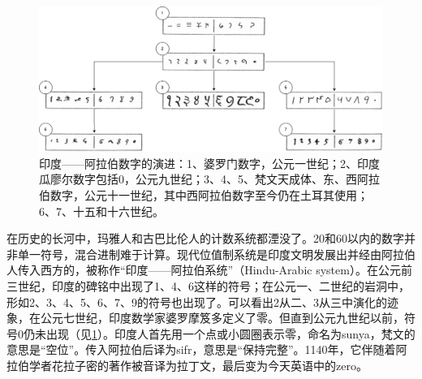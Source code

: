 \documentclass[b5paper]{ctexart}
\begin{document}
\begin{figure}[htbp]
 \centering
 \includegraphics[scale=0.3]{img/Hindu-arabic-num}
 \caption{印度——阿拉伯数字的演进：1、婆罗门数字，公元一世纪；2、印度瓜廖尔数字包括0，公元九世纪；3、4、5、梵文天成体、东、西阿拉伯数字，公元十一世纪，其中西阿拉伯数字至今仍在土耳其使用；6、7、十五和十六世纪。}
 \label{fig:hindu-arabic-numerals}
\end{figure}

   \label{sec:hindu-arabic-numerals}
在历史的长河中，玛雅人和古巴比伦人的计数系统都湮没了。20和60以内的数字并非单一符号，混合进制难于计算。现代位值制系统是印度文明发展出并经由阿拉伯人传入西方的，被称作“印度——阿拉伯系统”（Hindu-Arabic system）。在公元前三世纪，印度的碑铭中出现了1、4、6这样的符号；在公元一、二世纪的岩洞中，形如2、3、4、5、6、7、9的符号也出现了。可以看出2从二、3从三中演化的迹象，在公元七世纪，印度数学家婆罗摩笈多定义了零\cite{MacTutor-Brahmagupta-2000}。但直到公元九世纪以前，符号0仍未出现（见\cref{fig:hindu-arabic-numerals}）。印度人首先用一个点或小圆圈表示零，命名为sunya，梵文的意思是“空位”。传入阿拉伯后译为sifr，意思是“保持完整”。1140年，它伴随着阿拉伯学者花拉子密的著作被音译为拉丁文，最后变为今天英语中的zero。
\end{document}
